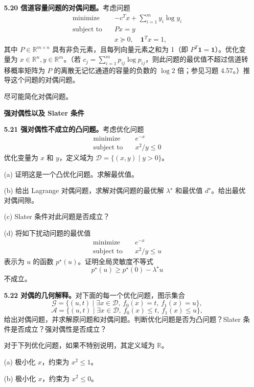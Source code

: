 \documentclass[UTF8, 12pt, fontset=fandol, oneside]{ctexart}
\begin{document}
\noindent\textbf{5.20 信道容量问题的对偶问题。}\quad 考虑问题
\[
\begin{aligned}
\text{minimize}\quad & -c^Tx+\sum_{i=1}^m y_i\log y_i\\
\text{subject to}\quad & Px=y\\
& x\succeq 0,\quad \mathbf{1}^Tx=1,
\end{aligned}
\]
其中 $P\in\mathbb{R}^{m\times n}$ 具有非负元素，且每列向量元素之和为 1（即 $P^T\mathbf{1}=\mathbf{1}$）。优化变量为 $x\in\mathbb{R}^n, y\in\mathbb{R}^m$。（若 $c_j=\sum_{i=1}^m p_{ij}\log p_{ij}$，则此问题的最优值不超过信道转移概率矩阵为 $P$ 的离散无记忆通道的容量的负数的 $\log 2$ 倍；参见习题 4.57。）推导这个问题的对偶问题。

尽可能简化对偶问题。

\noindent\textbf{强对偶性以及 Slater 条件}

\noindent\textbf{5.21 强对偶性不成立的凸问题。}\quad 考虑优化问题
\[
\begin{aligned}
\text{minimize}\quad & e^{-x}\\
\text{subject to}\quad & x^2/y\leq 0
\end{aligned}
\]
优化变量为 $x$ 和 $y$，定义域为 $\mathcal{D}=\{(x,y)\mid y>0\}$。

(a) 证明这是一个凸优化问题。求解最优值。

(b) 给出 Lagrange 对偶问题，求解对偶问题的最优解 $\lambda^\star$ 和最优值 $d^\star$。给出最优对偶间隙。

(c) Slater 条件对此问题是否成立？

(d) 将如下扰动问题的最优值
\[
\begin{aligned}
\text{minimize}\quad & e^{-x}\\
\text{subject to}\quad & x^2/y\leq u
\end{aligned}
\]
表示为 $u$ 的函数 $p^\star(u)$。证明全局灵敏度不等式
\[
p^\star(u)\geq p^\star(0)-\lambda^\star u
\]
不成立。

\noindent\textbf{5.22 对偶的几何解释。}\quad 对下面的每一个优化问题，图示集合
\[
\mathcal{G}=\{(u,t)\mid \exists x\in\mathcal{D},\ f_0(x)=t,\ f_1(x)=u\},
\]
\[
\mathcal{A}=\{(u,t)\mid \exists x\in\mathcal{D},\ f_0(x)\leq t,\ f_1(x)\leq u\},
\]
给出对偶问题，并求解原问题和对偶问题。判断优化问题是否为凸问题？Slater 条件是否成立？强对偶性是否成立？

对于下列优化问题，如果不特别说明，其定义域为 $\mathbb{R}$。

(a) 极小化 $x$，约束为 $x^2\leq 1$。

(b) 极小化 $x$，约束为 $x^2\leq 0$。
\end{document}
